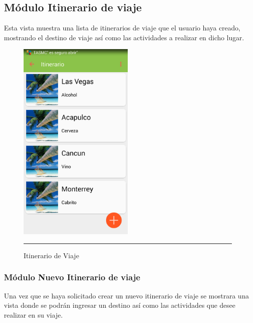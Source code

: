 \subsection{Módulo Itinerario de viaje}
Esta vista muestra una lista de itinerarios de viaje que el usuario haya creado, 
mostrando el destino de viaje así como las actividades a realizar en dicho lugar.

\begin{figure}[h]
	\centering
		\includegraphics[width=0.5\textwidth]{Figuras/itinerario.png}
		\rule{30em}{0.5pt}
	\caption[Itinerario de viaje]{Itinerario de Viaje}
	\label{fig:itinerario}
\end{figure}
\clearpage

\subsubsection{Módulo Nuevo Itinerario de viaje}
Una vez que se haya solicitado crear un nuevo itinerario de viaje se mostrara una vista donde se podrán ingresar un destino así como las actividades que desee realizar en su viaje.


